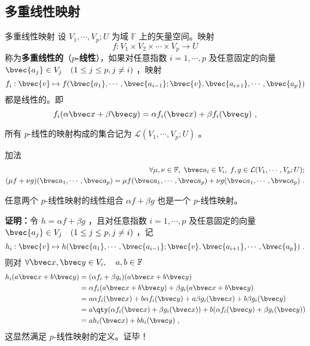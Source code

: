 \subsection{多重线性映射}
\begin{definition}{多重线性映射}
设 $V_1,\cdots,V_p;U$ 为域 $\mathbb{F}$ 上的矢量空间。映射
\begin{equation}
f:V_1\times V_2\times\cdots\times V_p\rightarrow U
\end{equation}
称为\textbf{多重线性的}（\textbf{$p$-线性}），如果对任意指数 $i=1,\cdots,p$ 及任意固定的向量 $\bvec{a_j}\in V_j\quad(1\leq j\leq p,j\neq i)$ ，映射
\begin{equation}
f_i:\bvec{v}\mapsto f(\bvec{a_1},\cdots,\bvec{a_{i-1}};\bvec{v},\bvec{a_{i+1}},\cdots,\bvec{a_p})
\end{equation}
都是线性的。即
\begin{equation}
f_i(\alpha\bvec x+\beta\bvec y)=\alpha f_i(\bvec x)+\beta f_i(\bvec y)~,
\end{equation}
\end{definition}
所有 $p$-线性的映射构成的集合记为 $\mathcal{L}(V_1,\cdots,V_p;U)$ 。
\begin{definition}{加法}
\begin{equation}
\begin{aligned}
\forall \mu,\nu\in\mathbb{F},\;\bvec a_i\in V_i,\;f,g\in \mathcal{L}(V_1,\cdots,V_p;U);\\
(\mu f+\nu g)(\bvec a_1,\cdots,\bvec a_p)=\mu f(\bvec a_1,\cdots,\bvec a_p)+\nu g(\bvec a_1,\cdots,\bvec a_p)~.
\end{aligned}
\end{equation}
\end{definition}
\begin{theorem}{}\label{MulMap_the1}
任意两个 $p$-线性映射的线性组合 $\alpha f+\beta g$ 也是一个 $p$-线性映射。
\end{theorem}
\textbf{证明：}令 $h=\alpha f+\beta g$ ，且对任意指数 $i=1,\cdots,p$ 及任意固定的向量 $\bvec{a_j}\in V_j\quad(1\leq j\leq p,j\neq i)$ ，记
\begin{equation}
h_i:\bvec{v}\mapsto h(\bvec{a_1},\cdots,\bvec{a_{i-1}};\bvec{v},\bvec{a_{i+1}},\cdots,\bvec{a_p})~.
\end{equation}
则对 $\forall \bvec x,\bvec y\in V_i,\quad a,b\in\mathbb{F}$
\begin{equation}
\begin{aligned}
h_i(a \bvec x+b\bvec y)&=(\alpha f_i+\beta g_i)(a \bvec x+b\bvec y)\\
&=\alpha f_i(a \bvec x+b\bvec y)+\beta g_i(a \bvec x+b\bvec y)\\
&=a\alpha f_i(\bvec x)+b\alpha f_i(\bvec y)+a\beta g_i(\bvec x)+b\beta g_i(\bvec y)\\
&=a\qty(\alpha f_i(\bvec x)+\beta g_i(\bvec x))+b(\alpha f_i(\bvec y)+\beta g_i(\bvec y))\\
&=ah_i(\bvec x)+bh_i(\bvec y)~,
\end{aligned}
\end{equation}
这显然满足 $p$-线性映射的定义。证毕！

